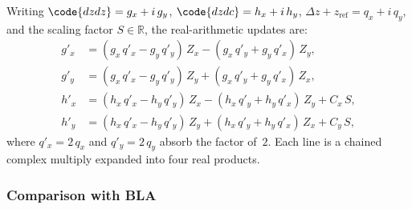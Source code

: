 Writing $\code{dzdz} = g_x + i\,g_y$, $\code{dzdc} = h_x + i\,h_y$,
$\Delta z + z_\mathrm{ref} = q_x + i\,q_y$, and the scaling factor
$S \in \mathbb{R}$, the real-arithmetic updates are:
\begin{align}
g'_x &= (g_x\,q'_x - g_y\,q'_y)\,Z_x
      - (g_x\,q'_y + g_y\,q'_x)\,Z_y, \\
g'_y &= (g_x\,q'_x - g_y\,q'_y)\,Z_y
      + (g_x\,q'_y + g_y\,q'_x)\,Z_x, \\
h'_x &= (h_x\,q'_x - h_y\,q'_y)\,Z_x
      - (h_x\,q'_y + h_y\,q'_x)\,Z_y
      + C_x\,S, \\
h'_y &= (h_x\,q'_x - h_y\,q'_y)\,Z_y
      + (h_x\,q'_y + h_y\,q'_x)\,Z_x
      + C_y\,S,
\end{align}
where $q'_x = 2\,q_x$ and $q'_y = 2\,q_y$ absorb the factor of~$2$.
Each line is a chained complex multiply expanded into four real products.

\subsubsection{Comparison with BLA}
\label{sec:la-vs-bla}


